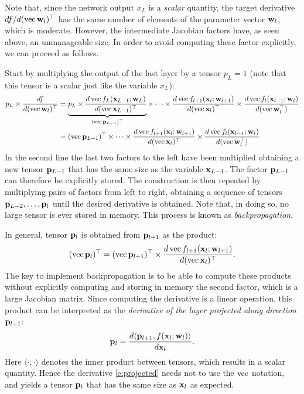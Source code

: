 Note that, since the network output $x_L$ is a \emph{scalar} quantity, the target derivative $df/d(\operatorname{vec} \mathbf{w}_l)^\top$ has the same number of elements of the parameter vector $\mathbf{w}_l$, which is moderate. However, the intermediate Jacobian factors have, as seen above, an unmanageable size. In order to avoid computing these factor explicitly, we can proceed as follows.

Start by multiplying the output of the last layer by a tensor $p_L=1$ (note that this tensor is a scalar just like the variable $x_L$):
\begin{align*}
p_L \times \frac{df}{d(\operatorname{vec} \mathbf{w}_l)^\top} 
&= 
\underbrace{p_L \times \frac{d\operatorname{vec} f_L(\mathbf{x}_{L-1};\mathbf{w}_{L})}{d(\operatorname{vec}\mathbf{x}_{L-1})^\top}}_{(\operatorname{vec} \mathbf{p}_{L-1})^\top}
\times
\dots
\times
\frac{d\operatorname{vec} f_{l+1}(\mathbf{x}_{l};\mathbf{w}_{l+1})}{d(\operatorname{vec}\mathbf{x}_{l})^\top}
\times
\frac{d\operatorname{vec} f_l(\mathbf{x}_{l-1};\mathbf{w}_{l})}{d(\operatorname{vec}\mathbf{w}_l^\top)}
\\
&=
(\operatorname{vec} \mathbf{p}_{L-1})^\top
\times
\dots
\times
\frac{d\operatorname{vec} f_{l+1}(\mathbf{x}_{l};\mathbf{w}_{l+1})}{d(\operatorname{vec}\mathbf{x}_{l})^\top}
\times
\frac{d\operatorname{vec} f_l(\mathbf{x}_{l-1};\mathbf{w}_{l})}{d(\operatorname{vec}\mathbf{w}_l^\top)}
\end{align*}
In the second line the last two factors to the left have been multiplied obtaining a new tensor $\mathbf{p}_{L-1}$ that has the same size as the variable $\mathbf{x}_{L-1}$. The factor $\mathbf{p}_{L-1}$ can therefore be explicitly stored. The construction is then repeated by multiplying pairs of factors from left to right, obtaining a sequence of tensors $\mathbf{p}_{L-2},\dots,\mathbf{p}_{l}$ until the desired derivative is obtained. Note that, in doing so, no large tensor is ever stored in memory. This process is known as \emph{backpropagation}.

In general, tensor $\mathbf{p}_{l}$ is obtained from $\mathbf{p}_{l+1}$ as the product:
\[
(\operatorname{vec} \mathbf{p}_{l})^\top = (\operatorname{vec} \mathbf{p}_{l+1})^\top \times \frac{d\operatorname{vec} f_{l+1}(\mathbf{x}_{l};\mathbf{w}_{l+1})}{d(\operatorname{vec}\mathbf{x}_{l})^\top}.
\]
The key to implement backpropagation is to be able to compute these products without explicitly computing and storing in memory the second factor, which is a large Jacobian matrix. Since computing the derivative is a linear operation, this product can be interpreted as the \emph{derivative of the layer projected along direction $\mathbf{p}_{l+1}$}: 
\begin{equation}\label{e:projected}
\mathbf{p}_{l} = 
\frac{d \langle \mathbf{p}_{l+1}, f(\mathbf{x}_l;\mathbf{w}_l) \rangle}
{d \mathbf{x}_{l}}.
\end{equation}
Here $\langle \cdot,\cdot \rangle$ denotes the inner product between tensors, which results in a scalar quantity. Hence the derivative \eqref{e:projected} needs not to use the $\operatorname{vec}$ notation, and yields a tensor $\mathbf{p}_l$ that has the same size as $\mathbf{x}_l$ as expected.


